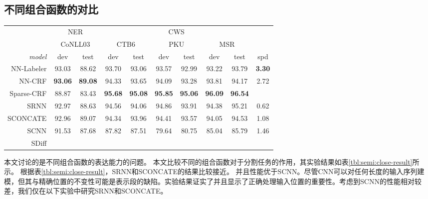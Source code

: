 \subsection{不同组合函数的对比}
\begin{table*}[t]
	\centering
	\begin{tabular}{r||cc | cc cc cc| c}
		\hline
		 & \multicolumn{2}{c|}{NER}  & \multicolumn{6}{c|}{CWS} & \\
		 & \multicolumn{2}{c|}{CoNLL03} & \multicolumn{2}{c}{CTB6} & \multicolumn{2}{c}{PKU} & \multicolumn{2}{c|}{MSR} & \\
		\textit{model} & dev & test & dev & test & dev & test & dev & test & spd \\
		\hline
		 \sc NN-Labeler & 93.03 & 88.62 & 93.70 & 93.06 & 93.57 & 92.99 & 93.22 & 93.79 & \bf 3.30 \\
		 \sc NN-CRF &\bf 93.06 &\bf 89.08 & 94.33 & 93.65 & 94.09 & 93.28 & 93.81 & 94.17 & 2.72 \\
		 \sc Sparse-CRF & 88.87 & 83.43 &\bf 95.68 &\bf 95.08 &\bf 95.85 &\bf 95.06 &\bf 96.09 &\bf 96.54 & \\
 		 \hdashline
		\sc SRNN & 92.97 & 88.63 & 94.56 & 94.06 & 94.86 & 93.91 & 94.38 & 95.21 & 0.62 \\
		\sc SCONCATE & 92.96 & 89.07 & 94.34 & 93.96 & 94.41 & 93.57 & 94.05 & 94.53 & 1.08 \\
		\sc SCNN & 91.53 & 87.68 & 87.82 & 87.51 & 79.64 & 80.75 & 85.04 & 85.79 & 1.46 \\
		SDiff & & & & & & & & & \\
		\hline
	\end{tabular}
	\caption{The NER and CWS results of the baseline models and our neural semi-CRF models with different input composition functions.
		{\it spd} represents the inference speed and is evaluated by the number of tokens processed per millisecond.}
	\label{tbl:semi:close-result}
\end{table*}
本文讨论的是不同组合函数的表达能力的问题。
本文比较不同的组合函数对于分割任务的作用，其实验结果如表\ref{tbl:semi:close-result}所示。
根据表\ref{tbl:semi:close-result}，SRNN和SCONCATE的结果比较接近。
并且性能优于SCNN。尽管CNN可以对任何长度的输入序列建模，但其与精确位置的不变性可能是表示段的缺陷。实验结果证实了并且显示了正确处理输入位置的重要性。考虑到SCNN的性能相对较差，我们仅在以下实验中研究SRNN和SCONCATE。


